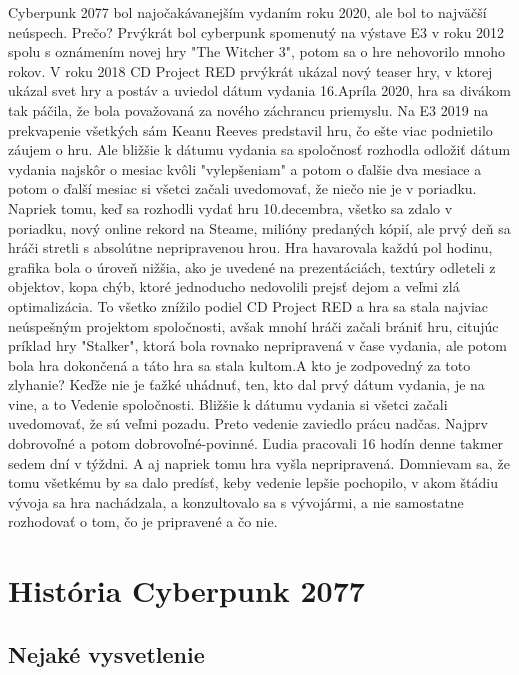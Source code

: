 \documentclass[10pt,twoside,slovak,a4paper]{article}
\begin{document}
Cyberpunk 2077 bol najočakávanejším vydaním roku 2020, ale bol to najväčší neúspech. Prečo? Prvýkrát bol cyberpunk spomenutý na výstave E3 v roku 2012 spolu s oznámením novej hry "The Witcher 3", potom sa o hre nehovorilo mnoho rokov. V roku 2018 CD Project RED prvýkrát ukázal nový teaser hry, v ktorej ukázal svet hry a postáv a uviedol dátum vydania 16.Apríla 2020, hra sa divákom tak páčila, že bola považovaná za nového záchrancu priemyslu. Na E3 2019 na prekvapenie všetkých sám Keanu Reeves predstavil hru, čo ešte viac podnietilo záujem o hru. Ale bližšie k dátumu vydania sa spoločnosť rozhodla odložiť dátum vydania najskôr o mesiac kvôli "vylepšeniam" a potom o ďalšie dva mesiace a potom o ďalší mesiac si všetci začali uvedomovať, že niečo nie je v poriadku. Napriek tomu, keď sa rozhodli vydať hru 10.decembra, všetko sa zdalo v poriadku, nový online rekord na Steame, milióny predaných kópií, ale prvý deň sa hráči stretli s absolútne nepripravenou hrou. Hra havarovala každú pol hodinu, grafika bola o úroveň nižšia, ako je uvedené na prezentáciách, textúry odleteli z objektov, kopa chýb, ktoré jednoducho nedovolili prejsť dejom a veľmi zlá optimalizácia. To všetko znížilo podiel CD Project RED a hra sa stala najviac neúspešným projektom spoločnosti, avšak mnohí hráči začali brániť hru, citujúc príklad hry "Stalker", ktorá bola rovnako nepripravená v čase vydania, ale potom bola hra dokončená a táto hra sa stala kultom.A kto je zodpovedný za toto zlyhanie? Keďže nie je ťažké uhádnuť, ten, kto dal prvý dátum vydania, je na vine, a to Vedenie spoločnosti. Bližšie k dátumu vydania si všetci začali uvedomovať, že sú veľmi pozadu. Preto vedenie zaviedlo prácu nadčas. Najprv dobrovoľné a potom dobrovoľné-povinné. Ľudia pracovali 16 hodín denne takmer sedem dní v týždni. A aj napriek tomu hra vyšla nepripravená. Domnievam sa, že tomu všetkému by sa dalo predísť, keby vedenie lepšie pochopilo, v akom štádiu vývoja sa hra nachádzala, a konzultovalo sa s vývojármi, a nie samostatne rozhodovať o tom, čo je pripravené a čo nie.



\section{História Cyberpunk 2077} \label{historia}




\subsection{Nejaké vysvetlenie} \label{ina:nejake}
\end{document}
